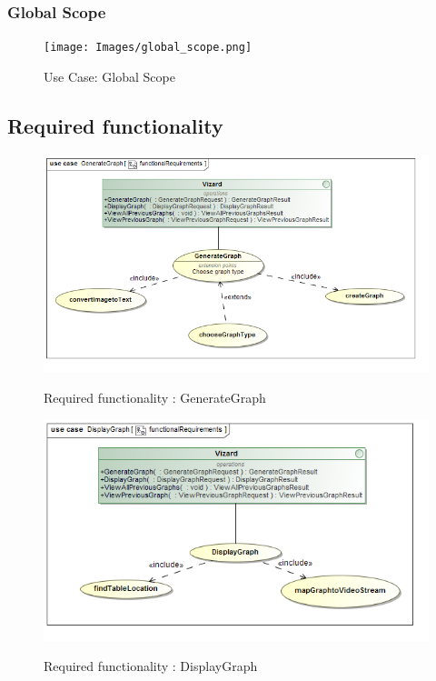 \documentclass[a4paper,12pt]{article}
\begin{document}
\subsubsection{Global Scope}
\begin{figure}[H]
		\texttt{[image: Images/global\_scope.png]}  \\
		\caption{Use Case: Global Scope}
	\end{figure}
\subsection{Required functionality}
	\begin{figure}[H]
		\includegraphics[width=\textwidth]{Images/uc__GenerateGraph__functionalRequirements.png}  \\
		\caption{Required functionality : GenerateGraph}
	\end{figure}
	\begin{figure}[H]
		\includegraphics[width=\textwidth]{Images/uc__DisplayGraph__functionalRequirements.png}  \\
		\caption{Required functionality : DisplayGraph}
	\end{figure}
\end{document}
